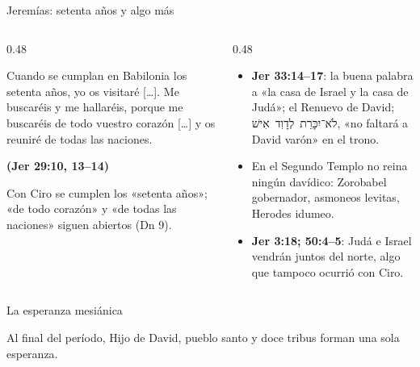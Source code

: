 \documentclass[hyperref={bookmarks=false},aspectratio=169]{beamer}
\newcommand{\heb}[1]{\mbox{\foreignlanguage{hebrew}{#1}}}
\newcommand{\fuente}[1]{\par\hfill{\upshape\bfseries\footnotesize\textcolor{ladrillo}{#1}}}
\newcommand{\notafig}[1]{\par\vspace{2pt}{\fontsize{5}{6}\selectfont\color{sepia}\hfill\textit{Nota.} #1\par}}
\newcommand{\elabpropia}{\notafig{Elaboración propia.}}
\begin{document}
\begin{frame}{Jeremías: setenta años y algo más}
\begin{columns}[T,onlytextwidth]
\begin{column}{0.48\textwidth}
\begin{cita}Cuando se cumplan en Babilonia los setenta años, yo os visitaré [\ldots]. Me buscaréis y me hallaréis, porque me buscaréis de todo vuestro corazón [\ldots] y os reuniré de todas las naciones.\fuente{(Jer 29:10, 13--14)}\end{cita}
\begin{clave}Con Ciro se cumplen los «setenta años»; «de todo corazón» y «de todas las naciones» siguen abiertos (Dn 9).\end{clave}
\end{column}
\begin{column}{0.48\textwidth}\footnotesize
\begin{itemize}
\item \textbf{Jer 33:14--17}: la buena palabra a «la casa de Israel y la casa de Judá»; el Renuevo de David; \heb{לֹא־יִכָּרֵת לְדָוִד אִישׁ}, «no faltará a David varón» en el trono.\medskip
\item En el Segundo Templo no reina ningún davídico: Zorobabel gobernador, asmoneos levitas, Herodes idumeo.\medskip
\item \textbf{Jer 3:18; 50:4--5}: Judá e Israel vendrán juntos del norte, algo que tampoco ocurrió con Ciro.
\end{itemize}
\end{column}
\end{columns}
\end{frame}

\begin{frame}{La esperanza mesiánica}
\centering
{}
\elabpropia
\vspace{8pt}
\begin{clave}\small Al final del período, Hijo de David, pueblo santo y doce tribus forman una sola esperanza.\end{clave}
\end{frame}
\end{document}
